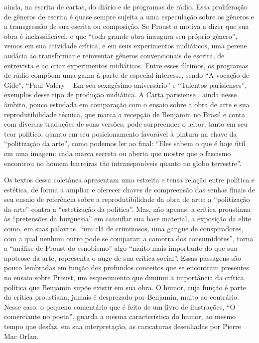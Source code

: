 ainda, na escrita de cartas, do diário e de programas de rádio. Essa
proliferação de gêneros de escrita é quase sempre sujeita a uma
especulação sobre os gêneros e a transgressão de sua escrita ou
composição. Se Proust o motiva a dizer que sua obra é inclassificável, e
que ``toda grande obra inaugura seu próprio gênero'', vemos em sua
atividade crítica, e em seus experimentos midiáticos, uma perene audácia
ao transformar e reinventar gêneros convencionais de escrita, de
entrevista e ao criar experimentos midiáticos. Entre esses últimos, os
programas de rádio compõem uma gama à parte de especial interesse, sendo
``A vocação de Gide'', ``Paul Valéry -- Em seu sexagésimo aniversário''
e ``Talentos parisienses'', exemplos desse tipo de produção midiática. A
Carta parisiense , ainda nesse âmbito, pouco estudada em comparação
com o ensaio sobre a obra de arte e sua reprodutibilidade técnica, que
marca a recepção de Benjamin no Brasil e conta com diversas traduções de
suas versões, pode surpreender o leitor, tanto em seu teor político,
quanto em seu posicionamento favorável à pintura na chave da
``politização da arte'', como podemos ler ao final: ``Eles sabem o que é
hoje útil em uma imagem: cada marca secreta ou aberta que mostre que o
fascismo encontrou no homem barreiras tão intransponíveis quanto no
globo terrestre''.

Os textos dessa coletânea apresentam uma estreita e tensa relação entre
política e estética, de forma a ampliar e oferecer chaves de compreensão
das senhas finais de seu ensaio de referência sobre a reprodutibilidade
da obra de arte: a ``politização da arte'' contra a ``estetização da
política''. Mas, não apenas: a crítica proustiana às ``pretensões da
burguesia'' em camuflar sua base material, a exposição da elite como, em
suas palavras, ``um clã de criminosos, uma gangue de conspiradores, com
a qual nenhum outro pode se comparar: a camorra dos consumidores'',
torna a ``análise de Proust do esnobismo'' algo ``muito mais importante
do que sua apoteose da arte, representa o auge de sua crítica social''.
Essas passagens são pouco lembradas em função dos profundos conceitos
que se encontram presentes no ensaio sobre Proust, um esquecimento que
diminui a importância da crítica política que Benjamin supõe existir em
sua obra. O humor, cuja função é parte da crítica proustiana, jamais é
desprezado por Benjamin, muito ao contrário. Nesse caso, o pequeno
comentário que é feito de um livro de ilustrações, ``O comerciante no
poeta'', guarda a mesma característica do humor, ao mesmo tempo que
desfaz, em sua interpretação, as caricaturas desenhadas por Pierre Mac
Orlan.

